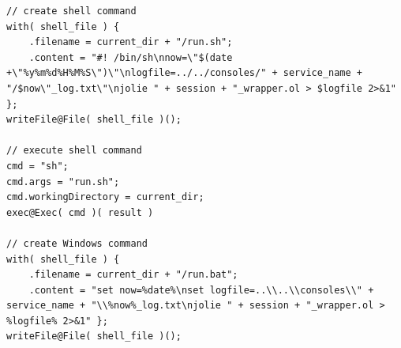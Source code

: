 \documentclass[12pt,a4paper]{article}
\begin{document}
\begin{lstlisting}[caption={Linux \& Windows starter commands},label={lst:linuxWindowsStartCommand}]
// create shell command                                                                                                                                                                                  
with( shell_file ) {                                                                                                                                                                                     
	.filename = current_dir + "/run.sh";                                                                                                                                                               
	.content = "#! /bin/sh\nnow=\"$(date +\"%y%m%d%H%M%S\")\"\nlogfile=../../consoles/" + service_name + "/$now\"_log.txt\"\njolie " + session + "_wrapper.ol > $logfile 2>&1" };                                                                                                                                                                                                       
writeFile@File( shell_file )();                                                                                                                                                                          
                                                                                                                                                                                                             
// execute shell command                                                                                                                                                                                 
cmd = "sh";                                                                                                                                                                                              
cmd.args = "run.sh";                                                                                                                                                                                     
cmd.workingDirectory = current_dir;                                                                                                                                                                      
exec@Exec( cmd )( result ) 

// create Windows command
with( shell_file ) {                                                                                                                                                                                     
	.filename = current_dir + "/run.bat";
	.content = "set now=%date%\nset logfile=..\\..\\consoles\\" + service_name + "\\%now%_log.txt\njolie " + session + "_wrapper.ol > %logfile% 2>&1" };                                                                                                                                                                                                       
writeFile@File( shell_file )();


\end{lstlisting}
\end{document}
